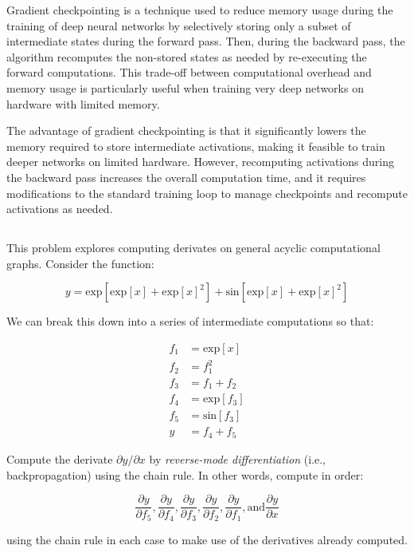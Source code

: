 \documentclass[12pt]{report}
\begin{document}
Gradient checkpointing is a technique used to reduce memory usage during the training of deep neural networks by selectively storing only a subset of intermediate states during the forward pass. Then, during the backward pass, the algorithm recomputes the non-stored states as needed by re-executing the forward computations. This trade-off between computational overhead and memory usage is particularly useful when training very deep networks on hardware with limited memory.

The advantage of gradient checkpointing is that it significantly lowers the memory required to store intermediate activations, making it feasible to train deeper networks on limited hardware. However, recomputing activations during the backward pass increases the overall computation time, and it requires modifications to the standard training loop to manage checkpoints and recompute activations as needed.

\newpage
\subsection{}
\begin{mdframed}
    This problem explores computing derivates on general acyclic computational graphs. Consider the function:

    \begin{equation}
        y = \text{exp}[\text{exp}[x] + \text{exp}[x]^{2}] + \text{sin}[\text{exp}[x] + \text{exp}[x]^{2}]
        \tag{7.42}
        \label{eq:7.42}
    \end{equation}

    We can break this down into a series of intermediate computations so that:

    \begin{align*}
        f_{1} & = \text{exp}[x]     \\
        f_{2} & = f_{1}^{2}         \\
        f_{3} & = f_{1} + f_{2}     \\
        f_{4} & = \text{exp}[f_{3}] \\
        f_{5} & = \text{sin}[f_{3}] \\
        y     & = f_{4} + f_{5}
    \end{align*}

    Compute the derivate $\partial y / \partial x$ by \textit{reverse-mode differentiation} (i.e., backpropagation) using the chain rule. In other words, compute in order:

    \begin{equation*}
        \frac{\partial y}{\partial f_{5}}, \frac{\partial y}{\partial f_{4}}, \frac{\partial y}{\partial f_{3}}, \frac{\partial y}{\partial f_{2}}, \frac{\partial y}{\partial f_{1}}, \text{and} \frac{\partial y}{\partial x}
    \end{equation*}

    using the chain rule in each case to make use of the derivatives already computed.
\end{mdframed}
\end{document}
